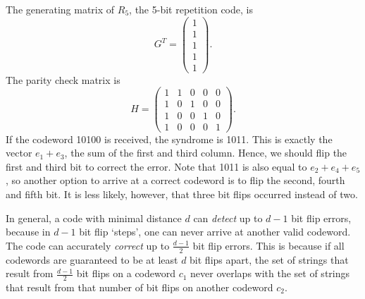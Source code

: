 \begin{example}
The generating matrix of $R_5$, the 5-bit repetition code, is
\[G^T = \left(\begin{array}{c}
1\\1\\1\\1\\1
\end{array}\right).\]
The parity check matrix is
\[
H = \left(\begin{array}{ccccc}
1&1&0&0&0\\
1&0&1&0&0\\
1&0&0&1&0\\
1&0&0&0&1
\end{array}\right).\]
If the codeword 10100 is received, the syndrome is 1011. This is exactly the vector $e_1 + e_3$, the sum of the first and third column. Hence, we should flip the first and third bit to correct the error. Note that 1011 is also equal to $e_2 + e_4 + e_5$, so another option to arrive at a correct codeword is to flip the second, fourth and fifth bit. It is less likely, however, that three bit flips occurred instead of two.
\end{example}
In general, a code with minimal distance $d$ can \emph{detect} up to $d-1$ bit flip errors, because in $d-1$ bit flip `steps', one can never arrive at another valid codeword. The code can accurately \emph{correct} up to $\frac{d-1}{2}$ bit flip errors. This is because if all codewords are guaranteed to be at least $d$ bit flips apart, the set of strings that result from $\frac{d-1}{2}$ bit flips on a codeword $c_1$ never overlaps with the set of strings that result from that number of bit flips on another codeword $c_2$.

